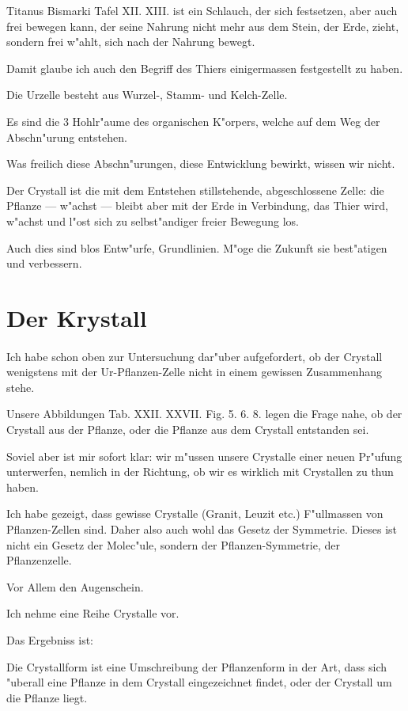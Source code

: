 \documentclass[a4paper, 11pt, oneside, german]{article}
\begin{document}
Titanus Bismarki Tafel XII. XIII. ist ein Schlauch, der sich festsetzen, aber auch frei bewegen kann, der seine Nahrung nicht mehr aus dem Stein, der Erde, zieht, sondern frei w"ahlt, sich nach der Nahrung bewegt.

Damit glaube ich auch den Begriff des Thiers einigermassen festgestellt zu haben.

Die Urzelle besteht aus Wurzel-, Stamm- und Kelch-Zelle.

Es sind die 3 Hohlr"aume des organischen K"orpers, welche auf dem Weg der Abschn"urung entstehen.

Was freilich diese Abschn"urungen, diese Entwicklung bewirkt, wissen wir nicht.

Der Crystall ist die mit dem Entstehen stillstehende, abgeschlossene Zelle: die Pflanze --- w"achst --- bleibt aber mit der Erde in Verbindung, das Thier wird, w"achst und l"ost sich zu selbst"andiger freier Bewegung los.

Auch dies sind blos Entw"urfe, Grundlinien. M"oge die Zukunft sie best"atigen und verbessern.
\clearpage
\section{Der Krystall}
\paragraph{}
Ich habe schon oben zur Untersuchung dar"uber aufgefordert, ob der Crystall wenigstens mit der Ur-Pflanzen-Zelle nicht in einem gewissen Zusammenhang stehe.

Unsere Abbildungen Tab. XXII. XXVII. Fig. 5. 6. 8. legen die Frage nahe, ob der Crystall aus der Pflanze, oder die Pflanze aus dem Crystall entstanden sei.

Soviel aber ist mir sofort klar: wir m"ussen unsere Crystalle einer neuen Pr"ufung unterwerfen, nemlich in der Richtung, ob wir es wirklich mit Crystallen zu thun haben.

Ich habe gezeigt, dass gewisse Crystalle (Granit, Leuzit etc.) F"ullmassen von Pflanzen-Zellen sind. Daher also auch wohl das Gesetz der Symmetrie. Dieses ist nicht ein Gesetz der Molec"ule, sondern der Pflanzen-Symmetrie, der Pflanzenzelle.

Vor Allem den Augenschein.

Ich nehme eine Reihe Crystalle vor.

Das Ergebniss ist:

Die Crystallform ist eine Umschreibung der Pflanzenform in der Art, dass sich "uberall eine Pflanze in dem Crystall eingezeichnet findet, oder der Crystall um die Pflanze liegt.
\end{document}
